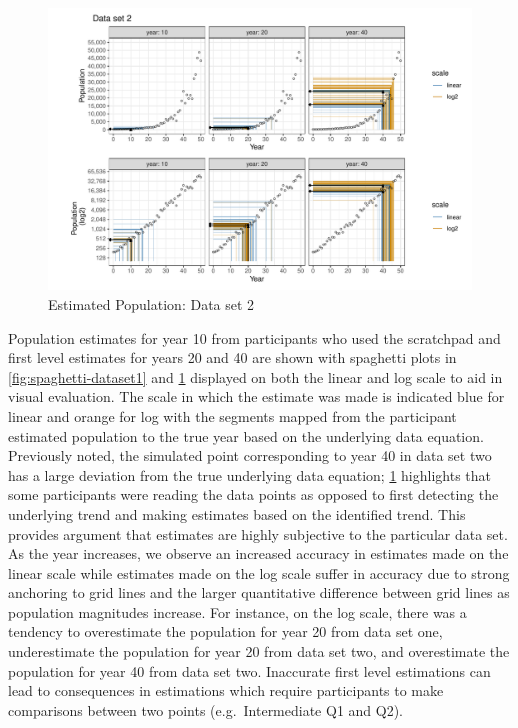 \documentclass[print]{nuthesis}
\begin{document}
\begin{figure}[tbp]

{\centering \includegraphics[width=1\linewidth,]{thesis_files/figure-latex/spaghetti-dataset2-1} 

}

\caption{Estimated Population: Data set 2}\label{fig:spaghetti-dataset2}
\end{figure}

Population estimates for year 10 from participants who used the scratchpad and first level estimates for years 20 and 40 are shown with spaghetti plots in \cref{fig:spaghetti-dataset1} and \cref{fig:spaghetti-dataset2} displayed on both the linear and log scale to aid in visual evaluation.
The scale in which the estimate was made is indicated blue for linear and orange for log with the segments mapped from the participant estimated population to the true year based on the underlying data equation.
Previously noted, the simulated point corresponding to year 40 in data set two has a large deviation from the true underlying data equation; \cref{fig:spaghetti-dataset2} highlights that some participants were reading the data points as opposed to first detecting the underlying trend and making estimates based on the identified trend.
This provides argument that estimates are highly subjective to the particular data set.
As the year increases, we observe an increased accuracy in estimates made on the linear scale while estimates made on the log scale suffer in accuracy due to strong anchoring to grid lines and the larger quantitative difference between grid lines as population magnitudes increase.
For instance, on the log scale, there was a tendency to overestimate the population for year 20 from data set one, underestimate the population for year 20 from data set two, and overestimate the population for year 40 from data set two.
Inaccurate first level estimations can lead to consequences in estimations which require participants to make comparisons between two points (e.g.~Intermediate Q1 and Q2).
\end{document}
